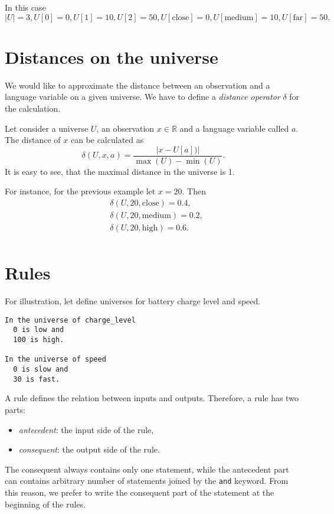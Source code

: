 \documentclass[a4paper,12pt]{article}
\begin{document}
In this case
\[
|U| = 3, U[0] = 0, U[1] = 10, U[2] = 50, U[\text{close}] = 0, U[\text{medium}] = 10, U[\text{far}] = 50.
\]

\section{Distances on the universe}

We would like to approximate the distance between an observation and a language variable on a given universe.
We have to define a \textit{distance operator} $\delta$ for the calculation.

Let consider a universe $U$, an observation $x \in \mathbb{R}$ and a language variable called $a$.
The distance of $x$ can be calculated as
\[
\delta(U, x, a) =
\dfrac{|x - U[a])|}{\max(U) - \min(U)}.
\]
It is easy to see, that the maximal distance in the universe is 1.

For instance, for the previous example let $x = 20$. Then
\begin{align*}
&\delta(U, 20, \text{close}) = 0.4, \\
&\delta(U, 20, \text{medium}) = 0.2, \\
&\delta(U, 20, \text{high}) = 0.6. \\
\end{align*}

\section{Rules}

For illustration, let define universes for battery charge level and speed.
\begin{verbatim}
In the universe of charge_level
  0 is low and
  100 is high.

In the universe of speed
  0 is slow and
  30 is fast.
\end{verbatim}

A rule defines the relation between inputs and outputs. Therefore, a rule has two parts:
\begin{itemize}
    \item \textit{antecedent}: the input side of the rule,
    \item \textit{consequent}: the output side of the rule.
\end{itemize}

The consequent always contains only one statement, while the antecedent part can contains arbitrary number of statements joined by the \texttt{and} keyword. From this reason, we prefer to write the consequent part of the statement at the beginning of the rules.
\end{document}
